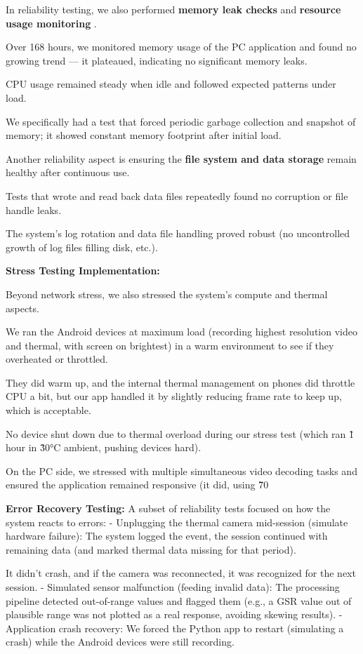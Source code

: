 {{{{{{{{{{{{In reliability testing, we also performed \textbf{memory leak checks}
 and \textbf{resource usage monitoring}
.

Over 168 hours, we monitored memory usage of the PC application and found no growing trend --- it plateaued, indicating no significant memory leaks.

CPU usage remained steady when idle and followed expected patterns under load.

We specifically had a test that forced periodic garbage collection and snapshot of memory; it showed constant memory footprint after initial load.

Another reliability aspect is ensuring the \textbf{file system and data storage}
 remain healthy after continuous use.

Tests that wrote and read back data files repeatedly found no corruption or file handle leaks.

The system's log rotation and data file handling proved robust (no uncontrolled growth of log files filling disk, etc.).

\textbf{Stress Testing Implementation:}

Beyond network stress, we also stressed the system's compute and thermal aspects.

We ran the Android devices at maximum load (recording highest resolution video and thermal, with screen on brightest) in a warm environment to see if they overheated or throttled.

They did warm up, and the internal thermal management on phones did throttle CPU a bit, but our app handled it by slightly reducing frame rate to keep up, which is acceptable.

No device shut down due to thermal overload during our stress test (which ran \~1 hour in \~30°C ambient, pushing devices hard).

On the PC side, we stressed with multiple simultaneous video decoding tasks and ensured the application remained responsive (it did, using \~70%

\textbf{Error Recovery Testing:}
 A subset of reliability tests focused on how the system reacts to errors: - Unplugging the thermal camera mid-session (simulate hardware failure): The system logged the event, the session continued with remaining data (and marked thermal data missing for that period).

It didn't crash, and if the camera was reconnected, it was recognized for the next session. - Simulated sensor malfunction (feeding invalid data): The processing pipeline detected out-of-range values and flagged them (e.g., a GSR value out of plausible range was not plotted as a real response, avoiding skewing results). - Application crash recovery: We forced the Python app to restart (simulating a crash) while the Android devices were still recording.

}}}}}}}}}}}}
